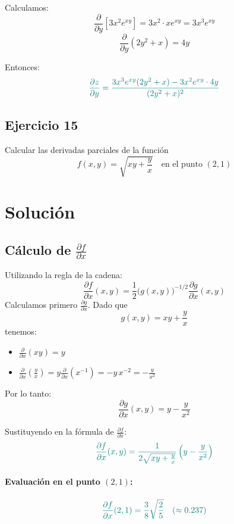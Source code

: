 \documentclass{article}
\begin{document}
Calculamos:
\[
\frac{\partial}{\partial y}[3x^2 e^{xy}]
= 3x^2 \cdot x e^{xy} = 3x^3 e^{xy}
\]
\[
\frac{\partial}{\partial y}(2y^2 + x) = 4y
\]

Entonces:
\[
\color{teal}
\frac{\partial z}{\partial y}
= \frac{
3x^3 e^{xy}(2y^2 + x) - 3x^2 e^{xy} \cdot 4y
}{
(2y^2 + x)^2
}
\]



\newpage
\subsection{Ejercicio 15}
Calcular las derivadas parciales de la función 
\[
f(x,y) = \sqrt{xy + \frac{y}{x}} 
\quad \text{en el punto } (2,1)
\]

\newpage
\section*{Solución}

\subsection*{Cálculo de \(\frac{\partial f}{\partial x}\)}
Utilizando la regla de la cadena:
\[
\frac{\partial f}{\partial x}(x,y)=\frac{1}{2}\bigl( g(x,y) \bigr)^{-1/2}\frac{\partial g}{\partial x}(x,y)
\]
Calculamos primero \(\frac{\partial g}{\partial x}\). Dado que
\[
g(x,y)=xy+\frac{y}{x}
\]
tenemos:
\begin{itemize}
    \item \(\frac{\partial}{\partial x}(xy)= y\)
    \item \(\frac{\partial}{\partial x}\left(\frac{y}{x}\right)= y \frac{\partial}{\partial x}\left(x^{-1}\right)=-y\, x^{-2}=-\frac{y}{x^2}\)
\end{itemize}
Por lo tanto:
\[
\frac{\partial g}{\partial x}(x,y)= y-\frac{y}{x^2}
\]

Sustituyendo en la fórmula de \(\frac{\partial f}{\partial x}\):
\[\color{teal}
\frac{\partial f}{\partial x}(x,y)= \frac{1}{2\sqrt{xy+\frac{y}{x}}}\left(y-\frac{y}{x^2}\right)
\]

\paragraph{Evaluación en el punto \((2,1)\):}
\[\color{teal}
\frac{\partial f}{\partial x}(2,1)= \frac{3}{8}\sqrt{\frac{2}{5}} \quad (\approx 0.237)
\]
\end{document}
